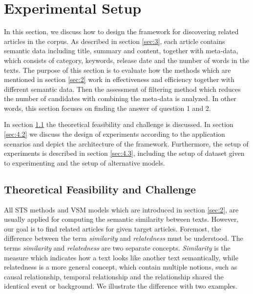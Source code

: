 \section{Experimental Setup}
\label{sec:4}
In this section, we discuss how to design the framework for discovering related articles in the corpus. As described in section \ref{sec:3}, each article contains semantic data including title, summary and content, together with meta-data, which consists of category, keywords, release date and the number of words in the texts. The purpose of this section is to evaluate how the methods which are mentioned in section \ref{sec:2} work in effectiveness and efficiency together with different semantic data. Then the assessment of filtering method which reduces the number of candidates with combining the meta-data is analyzed. In other words, this section focuses on finding the answer of question 1 and 2.

In section \ref{sec:4.1} the theoretical feasibility and challenge is discussed. In section \ref{sec:4.2} we discuss the design of experiments according to the application scenarios and depict the architecture of the framework. Furthermore, the setup of experiments is described in section \ref{sec:4.3}, including the setup of dataset given to experimenting and the setup of alternative models. 

\subsection{Theoretical Feasibility and Challenge}
\label{sec:4.1}

All STS methods and VSM models which are introduced in section \ref{sec:2}, are usually applied for computing the semantic similarity between texts. However, our goal is to find related articles for given target articles. Foremost, the difference between the term \textit{similarity} and \textit{relatedness} must be understood. The terms \textit{similarity} and \textit{relatedness} are two separate concepts\cite{pedersen2007measures}. \textit{Similarity} is the measure which indicates how a text looks like another text semantically, while relatedness is a more general concept, which contain multiple notions, such as causal relationship, temporal relationship and the relationship shared the identical event or background. We illustrate the difference with two examples. 

